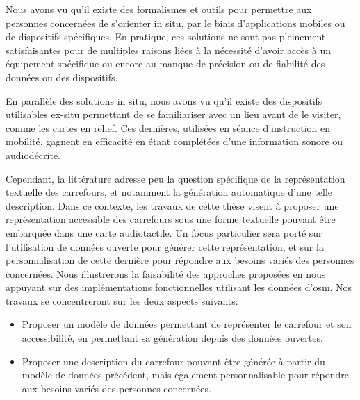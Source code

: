 \newpar{}

Nous avons vu qu'il existe des formalismes et outils pour permettre aux personnes concernées de s'orienter in situ, par le biais d'applications mobiles ou de dispositifs spécifiques. En pratique, ces solutions ne sont pas pleinement satisfaisantes pour de multiples raisons liées à la nécessité d'avoir accès à un équipement spécifique ou encore au manque de précision ou de fiabilité des données ou des dispositifs.

\newpar{}

En parallèle des solutions in situ, nous avons vu qu'il existe des dispositifs utilisables ex-situ permettant de se familiariser avec un lieu avant de le visiter, comme les cartes en relief. Ces dernières, utilisées en séance d'instruction en mobilité, gagnent en efficacité en étant complétées d'une information sonore ou audiodécrite.

\newpar{}

Cependant, la littérature adresse peu la question spécifique de la représentation textuelle des carrefours, et notamment la génération automatique d'une telle description. Dans ce contexte, les travaux de cette thèse visent à proposer une représentation accessible des carrefours sous une forme textuelle pouvant être embarquée dans une carte audiotactile. Un focus particulier sera porté sur l'utilisation de données ouverte pour générer cette représentation, et sur la personnalisation de cette dernière pour répondre aux besoins variés des personnes concernées. Nous illustrerons la faisabilité des approches proposées en nous appuyant sur des implémentations fonctionnelles utilisant les données d'\gls{osm}. Nos travaux se concentreront sur les deux aspects suivants:

\begin{itemize}
    \item Proposer un modèle de données permettant de représenter le carrefour et son accessibilité, en permettant sa génération depuis des données ouvertes.
    \item Proposer une description du carrefour pouvant être générée à partir du modèle de données précédent, mais également personnalisable pour répondre aux besoins variés des personnes concernées.
\end{itemize}